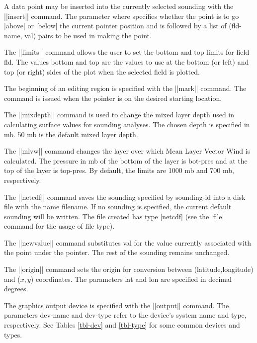 \begin{glossarylist}
	A data point may be inserted into the currently selected sounding
	with the ||insert|| command.  The parameter {\pf where} specifies
	whether the point is to go |above| or |below| the current pointer
	position and is followed by a list of ({\pf fld-name}, {\pf val})
	pairs to be used in making the point.

	The ||limits|| command allows the user to set the bottom and top
	limits for field {\pf fld}.  The values {\pf bottom} and {\pf top}
	are the values to use at the bottom (or left) and top (or right)
	sides of the plot when the selected field is plotted.

	The beginning of an editing region is specified with the ||mark||
	command.  The command is issued when the pointer is on the desired
	starting location.

	The ||mixdepth|| command is used to change the mixed layer depth used 
	in calculating surface values for sounding analyses.  The chosen
	{\pf depth} is specified in mb.  50 mb is the default mixed layer
	depth.

	The ||mlvw|| command changes the layer over which Mean Layer Vector
	Wind is calculated.  The pressure in mb of the bottom of the layer is
	{\pf bot-pres} and at the top of the layer is {\pf top-pres}.  By
	default, the limits are 1000 mb and 700 mb, respectively.

	The ||netcdf|| command saves the sounding specified by 
	{\pf sounding-id} into a disk file with the name {\pf filename}.
	If no sounding is specified, the current default sounding will be 
	written.  The file created has type |netcdf| (see the |file| 
	command for the usage of file type).

	The ||newvalue|| command substitutes {\pf val} for the value currently
	associated with the point under the pointer.  The rest of the sounding
	remains unchanged.

	The ||origin|| command sets the origin for conversion between
	(latitude,longitude) and ($x,y$) coordinates.  The parameters
	{\pf lat} and {\pf lon} are specified in decimal degrees.

	The graphics output device is specified with the ||output|| command.
	The parameters {\pf dev-name} and {\pf dev-type} refer to the device's
	system name and type, respectively.  See Tables \ref{tbl-dev} and 
	\ref{tbl-type} for some common devices and types.


\end{glossarylist}
